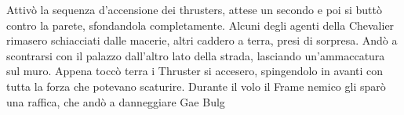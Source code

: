     Attivò la sequenza d'accensione dei thrusters, attese un secondo e poi si buttò contro la parete, sfondandola
    completamente. Alcuni degli agenti della Chevalier rimasero schiacciati dalle macerie, altri caddero a terra, presi
    di sorpresa. Andò a scontrarsi con il palazzo dall'altro lato della strada, lasciando un'ammaccatura sul muro.
    Appena toccò terra i Thruster si accesero, spingendolo in avanti con tutta la forza che potevano scaturire. Durante
    il volo il Frame nemico gli sparò una raffica, che andò a danneggiare Gae Bulg
